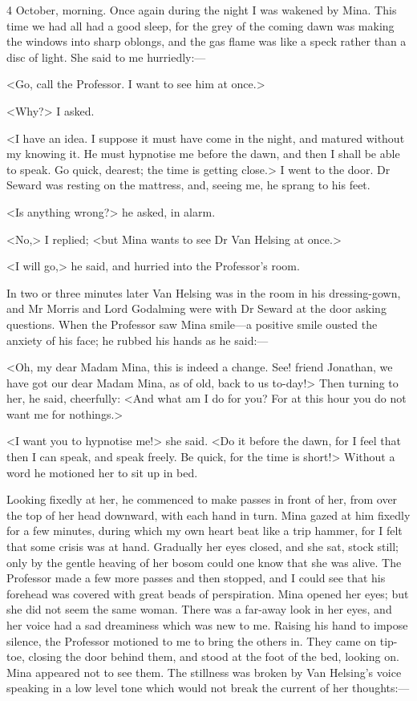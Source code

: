 \begin{diary}{4 October, morning.}
Once again during the night I was wakened by Mina. This time we had all had a good sleep, for the grey of the coming dawn was making the windows into sharp oblongs, and the gas flame was like a speck rather than a disc of light. She said to me hurriedly:—

<Go, call the Professor. I want to see him at once.>

<Why?> I asked.

<I have an idea. I suppose it must have come in the night, and matured without my knowing it. He must hypnotise me before the dawn, and then I shall be able to speak. Go quick, dearest; the time is getting close.> I went to the door. Dr Seward was resting on the mattress, and, seeing me, he sprang to his feet.

<Is anything wrong?> he asked, in alarm.

<No,> I replied; <but Mina wants to see Dr Van Helsing at once.>

<I will go,> he said, and hurried into the Professor's room.

In two or three minutes later Van Helsing was in the room in his dressing-gown, and Mr Morris and Lord Godalming were with Dr Seward at the door asking questions. When the Professor saw Mina smile—a positive smile ousted the anxiety of his face; he rubbed his hands as he said:—

<Oh, my dear Madam Mina, this is indeed a change. See! friend Jonathan, we have got our dear Madam Mina, as of old, back to us to-day!> Then turning to her, he said, cheerfully: <And what am I do for you? For at this hour you do not want me for nothings.>

<I want you to hypnotise me!> she said. <Do it before the dawn, for I feel that then I can speak, and speak freely. Be quick, for the time is short!> Without a word he motioned her to sit up in bed.

Looking fixedly at her, he commenced to make passes in front of her, from over the top of her head downward, with each hand in turn. Mina gazed at him fixedly for a few minutes, during which my own heart beat like a trip hammer, for I felt that some crisis was at hand. Gradually her eyes closed, and she sat, stock still; only by the gentle heaving of her bosom could one know that she was alive. The Professor made a few more passes and then stopped, and I could see that his forehead was covered with great beads of perspiration. Mina opened her eyes; but she did not seem the same woman. There was a far-away look in her eyes, and her voice had a sad dreaminess which was new to me. Raising his hand to impose silence, the Professor motioned to me to bring the others in. They came on tip-toe, closing the door behind them, and stood at the foot of the bed, looking on. Mina appeared not to see them. The stillness was broken by Van Helsing's voice speaking in a low level tone which would not break the current of her thoughts:—


\end{diary}
